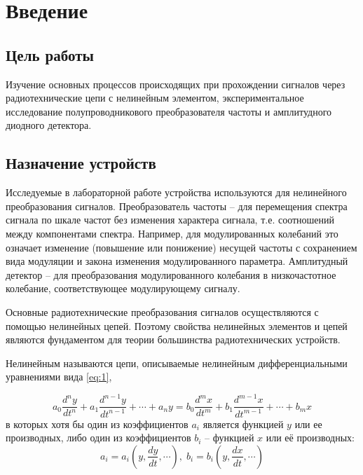 


\def\labauthors{Виноградов И.Д., Понур К.А., Шиков А.П.}
\def\labgroup{430}
\def\labnumber{6}
\def\labtheme{Нелинейные преобразования сигналов}
\renewcommand{\vec}{\mathbf}
\renewcommand{\Re}{\operatorname{Re}}
\renewcommand{\Im}{\operatorname{Im}}
\renewcommand{\phi}{\varphi}
\renewcommand{\hat}{\widehat}



\tableofcontents
\newpage
\section{Введение}

\subsection*{Цель работы}
Изучение основных процессов происходящих при прохождении сигналов через радиотехнические цепи с нелинейным элементом, экспериментальное исследование полупроводникового преобразователя частоты и амплитудного диодного детектора.
\subsection*{Назначение устройств}
Исследуемые в лабораторной работе устройства используются для нелинейного преобразования сигналов. Преобразователь частоты -- для перемещения спектра сигнала по шкале частот без изменения характера сигнала, т.е. соотношений между компонентами спектра. Например, для модулированных колебаний это означает изменение (повышение или понижение) несущей частоты с сохранением вида модуляции и закона изменения модулированного параметра. Амплитудный детектор -- для преобразования модулированного колебания в низкочастотное колебание, соответствующее модулирующему сигналу.

Основные радиотехнические преобразования сигналов осуществляются с помощью нелинейных цепей. Поэтому свойства нелинейных элементов и цепей являются фундаментом для теории большинства радиотехнических устройств.

Нелинейным называются цепи, описываемые нелинейным дифференциальными уравнениями вида \eqref{eq:1},

\begin{equation}
a_0\frac{d^ny}{dt^n}+a_1\frac{d^{n-1}y}{dt^{n-1}}+\cdots+a_ny=b_0\frac{d^mx}{dt^m}+b_1\frac{d^{m-1}x}{dt^{m-1}}+\cdots+b_mx
\label{eq:1}
\end{equation}
в которых хотя бы один из коэффициентов $a_i$ является функцией $y$ или ее производных, либо один из коэффициентов $b_i$ -- функцией $x$ или её производных:
\begin{equation*}
a_i=a_i(y,\frac{dy}{dt},\cdots),\;b_i=b_i(y,\frac{dx}{dt},\cdots)
\end{equation*}

